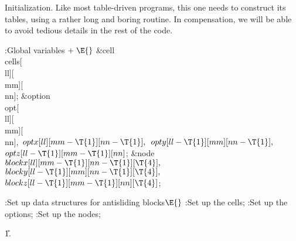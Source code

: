 Initialization. Like most table-driven programs, this one needs to
construct its tables, using a rather long and boring routine. In compensation,
we will be able to avoid tedious details in the rest of the code.

\Y\B\4:Global variables\X${}\mathrel+\E{}$\6
\&{cell} \\{cells}[\\{ll}][\\{mm}][\\{nn}];\6
\&{option} \\{opt}[\\{ll}][\\{mm}][\\{nn}]${},{}$ ${}\\{optx}[\\{ll}][\\{mm}-%
\T{1}][\\{nn}-\T{1}],{}$ ${}\\{opty}[\\{ll}-\T{1}][\\{mm}][\\{nn}-\T{1}],{}$
${}\\{optz}[\\{ll}-\T{1}][\\{mm}-\T{1}][\\{nn}]{}$;\6
\&{node} ${}\\{blockx}[\\{ll}][\\{mm}-\T{1}][\\{nn}-\T{1}][\T{4}],{}$ ${}%
\\{blocky}[\\{ll}-\T{1}][\\{mm}][\\{nn}-\T{1}][\T{4}],{}$ ${}\\{blockz}[\\{ll}-%
\T{1}][\\{mm}-\T{1}][\\{nn}][\T{4}]{}$;\par
\fi

\B{}:Set up data structures for antisliding blocks\X${}\E{}$\6
:Set up the cells\X;\6
:Set up the options\X;\6
:Set up the nodes\X;\par
\U1.\fi

